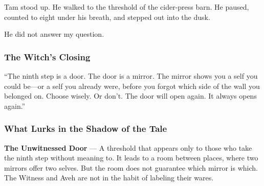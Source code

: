 \documentclass[12pt]{article}
\begin{document}
Tam stood up. He walked to the threshold of the cider-press barn. He paused, counted to eight under his breath, and stepped out into the dusk.

He did not answer my question.

\subsubsection{The Witch's Closing}
``The ninth step is a door. The door is a mirror. The mirror shows you a self you could be---or a self you already were, before you forgot which side of the wall you belonged on. Choose wisely. Or don't. The door will open again. It always opens again.''

\subsubsection{What Lurks in the Shadow of the Tale}
\textbf{The Unwitnessed Door} --- A threshold that appears only to those who take the ninth step without meaning to. It leads to a room between places, where two mirrors offer two selves. But the room does not guarantee which mirror is which. The Witness and Aveh are not in the habit of labeling their wares.
\end{document}
